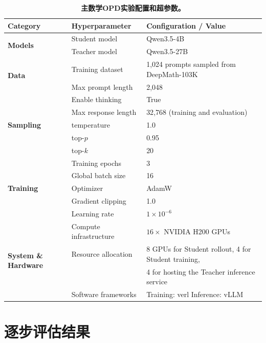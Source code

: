 \begin{table}[t]
\caption{\textbf{主数学OPD实验配置和超参数。}}
\label{tab:opd-hyperparameters}
\centering
\small
\renewcommand{\arraystretch}{1.18}
\setlength{\tabcolsep}{6pt}
\begin{tabular}{@{}lll@{}}
\toprule
\textbf{Category} & \textbf{Hyperparameter} & \textbf{Configuration / Value} \\
\midrule

\multirow{2}{*}{\textbf{Models}}
& Student model & Qwen3.5-4B \\
& Teacher model & Qwen3.5-27B \\
\midrule

\multirow{2}{*}{\textbf{Data}}
& Training dataset & 1{,}024 prompts sampled from DeepMath-103K \\
& Max prompt length & 2{,}048 \\
\midrule

\multirow{5}{*}{\textbf{Sampling}}
& Enable thinking & True \\
& Max response length & 32{,}768 (training and evaluation) \\
& temperature & 1.0 \\
& top-$p$ & 0.95 \\
& top-$k$ & 20 \\
\midrule

\multirow{5}{*}{\textbf{Training}}
& Training epochs & 3 \\
& Global batch size & 16 \\
& Optimizer & AdamW \\
& Gradient clipping & 1.0 \\
& Learning rate & $1\times10^{-6}$ \\
\midrule

\multirow{4}{*}{\textbf{System \& Hardware}}
& Compute infrastructure & $16\times$ NVIDIA H200 GPUs \\
& Resource allocation & 8 GPUs for Student rollout, 4 for Student training, \\
& & 4 for hosting the Teacher inference service \\
& Software frameworks & Training: verl \quad Inference: vLLM \\
\bottomrule
\end{tabular}
\end{table}


\section{逐步评估结果}

